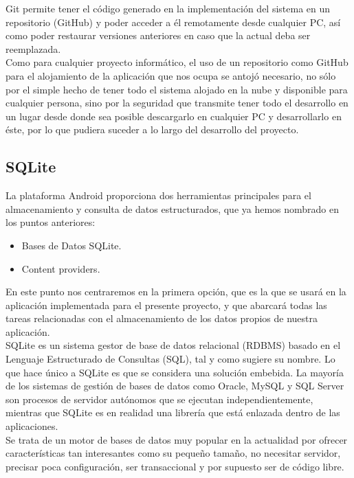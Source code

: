 Git permite tener el código generado en la implementación del sistema en un repositorio (GitHub) y poder acceder a él remotamente desde cualquier PC, así como poder restaurar versiones anteriores en caso que la actual deba ser reemplazada.\\

Como para cualquier proyecto informático, el uso de un repositorio como GitHub para el alojamiento de la aplicación que nos ocupa se antojó necesario, no sólo por el simple hecho de tener todo el sistema alojado en la nube y disponible para cualquier persona, sino por la seguridad que transmite tener todo el desarrollo en un lugar desde donde sea posible descargarlo en cualquier PC y desarrollarlo en éste, por lo que pudiera suceder a lo largo del desarrollo del proyecto.

\subsection{SQLite}

La plataforma Android proporciona dos herramientas principales para el almacenamiento y consulta de datos estructurados, que ya hemos nombrado en los puntos anteriores:

\begin{itemize}
\item Bases de Datos SQLite.
\item Content providers.
\end{itemize}

En este punto nos centraremos en la primera opción, que es la que se usará en la aplicación implementada para el presente proyecto, y que abarcará todas las tareas relacionadas con el almacenamiento de los datos propios de nuestra aplicación.\\

SQLite \cite{website:sqlite} es un sistema gestor de base de datos relacional (RDBMS) basado en el Lenguaje Estructurado de Consultas (SQL), tal y como sugiere su nombre. Lo que hace único a SQLite es que se considera una solución embebida. La mayoría de los sistemas de gestión de bases de datos como Oracle, MySQL y SQL Server son procesos de servidor autónomos que se ejecutan independientemente, mientras que SQLite es en realidad una librería que está enlazada dentro de las aplicaciones.\\

Se trata de un motor de bases de datos muy popular en la actualidad por ofrecer características tan interesantes como su pequeño tamaño, no necesitar servidor, precisar poca configuración, ser transaccional y por supuesto ser de código libre.\\

